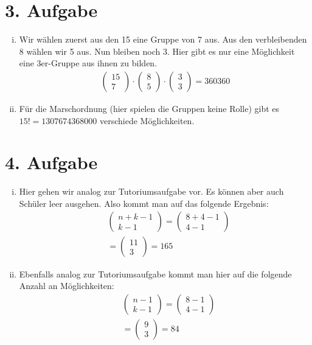 \documentclass[10pt,a4paper,parskip=half]{scrartcl}
\begin{document}
\section*{3. Aufgabe}
\begin{enumerate}[(i)]
\item
	Wir wählen zuerst aus den 15 eine Gruppe von 7 aus. Aus den verbleibenden 8 wählen wir 5 aus. Nun bleiben noch 3. Hier gibt es nur eine Möglichkeit eine 3er-Gruppe aus ihnen zu bilden.
	\begin{align*}
	\begin{pmatrix}15\\7\end{pmatrix}\cdot\begin{pmatrix}8\\5\end{pmatrix}\cdot\begin{pmatrix}3\\3\end{pmatrix} = 360360
	\end{align*}
\item
	Für die Marschordnung (hier spielen die Gruppen keine Rolle) gibt es $15! = 1307674368000$ verschiede Möglichkeiten.
\end{enumerate}
\section*{4. Aufgabe}
\begin{enumerate}[(i)]
\item
	Hier gehen wir analog zur Tutoriumsaufgabe vor. Es können aber auch Schüler leer ausgehen. Also kommt man auf das folgende Ergebnis:
	\begin{align*}
	&\begin{pmatrix}n+k-1\\k-1\end{pmatrix}=\begin{pmatrix}8+4-1\\4-1\end{pmatrix}\\
	&= \begin{pmatrix}11\\3\end{pmatrix} = 165
	\end{align*}
\item
	Ebenfalls analog zur Tutoriumsaufgabe kommt man hier auf die folgende Anzahl an Möglichkeiten:
	\begin{align*}
	&\begin{pmatrix}n-1\\k-1\end{pmatrix}=\begin{pmatrix}8-1\\4-1\end{pmatrix}\\
	&= \begin{pmatrix}9\\3\end{pmatrix} = 84
	\end{align*}
\end{enumerate}
\end{document}
